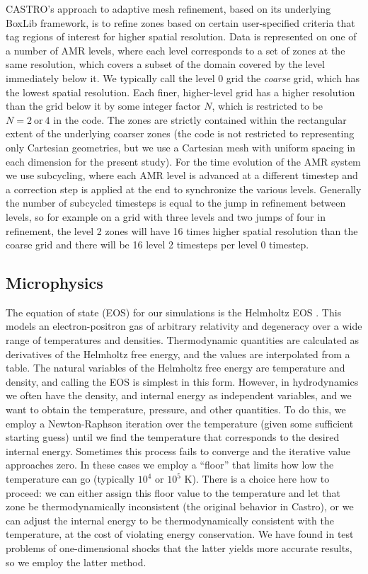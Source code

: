 \documentclass[12pt,preprint]{aastex}
\begin{document}
CASTRO's approach to adaptive mesh refinement, based on its underlying BoxLib framework, is to refine zones based on certain user-specified criteria that tag regions of interest for higher spatial resolution. Data is represented on one of a number of AMR levels, where each level corresponds to a set of zones at the same resolution, which covers a subset of the domain covered by the level immediately below it. We typically call the level 0 grid the \textit{coarse} grid, which has the lowest spatial resolution. Each finer, higher-level grid has a higher resolution than the grid below it by some integer factor $N$, which is restricted to be $N = 2\ \text{or}\ 4$ in the code. The zones are strictly contained within the rectangular extent of the underlying coarser zones (the code is not restricted to representing only Cartesian geometries, but we use a Cartesian mesh with uniform spacing in each dimension for the present study). For the time evolution of the AMR system we use subcycling, where each AMR level is advanced at a different timestep and a correction step is applied at the end to synchronize the various levels. Generally the number of subcycled timesteps is equal to the jump in refinement between levels, so for example on a grid with three levels and two jumps of four in refinement, the level 2 zones will have 16 times higher spatial resolution than the coarse grid and there will be 16 level 2 timesteps per level 0 timestep.

\subsection{Microphysics}

The equation of state (EOS) for our simulations is the Helmholtz EOS \citep{timmes_swesty:2000}. This models an electron-positron gas of arbitrary relativity and degeneracy over a wide range of temperatures and densities. Thermodynamic quantities are calculated as derivatives of the Helmholtz free energy, and the values are interpolated from a table. The natural variables of the Helmholtz free energy are temperature and density, and calling the EOS is simplest in this form. However, in hydrodynamics we often have the density, and internal energy as independent variables, and we want to obtain the temperature, pressure, and other quantities. To do this, we employ a Newton-Raphson iteration over the temperature (given some sufficient starting guess) until we find the temperature that corresponds to the desired internal energy. Sometimes this process fails to converge and the iterative value approaches zero. In these cases we employ a ``floor'' that limits how low the temperature can go (typically $10^4$ or $10^5$ K). There is a choice here how to proceed: we can either assign this floor value to the temperature and let that zone be thermodynamically inconsistent (the original behavior in Castro), or we can adjust the internal energy to be thermodynamically consistent with the temperature, at the cost of violating energy conservation. We have found in test problems of one-dimensional shocks that the latter yields more accurate results, so we employ the latter method.
\end{document}
